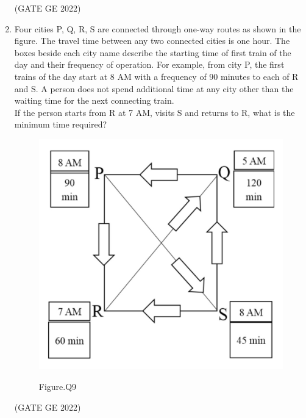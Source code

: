 \documentclass[journal,12pt,onecolumn]{IEEEtran}
\theoremstyle{remark}
\begin{document}
\begin{enumerate}
\hfill (GATE GE 2022)

\begin{enumerate}
\end{enumerate}

\item Four cities P, Q, R, S are connected through one-way routes as shown in the figure. The travel time between any two connected cities is one hour. The boxes beside each city name describe the starting time of first train of the day and their frequency of operation. For example, from city P, the first trains of the day start at 8 AM with a frequency of 90 minutes to each of R and S. A person does not spend additional time at any city other than the waiting time for the next connecting train. \\
If the person starts from R at 7 AM, visits S and returns to R, what is the minimum time required?
\begin{figure}[H]
    \centering
    \includegraphics[width=0.4\columnwidth]{figs/fig_9.png}
    \label{fig:question9}
    \caption*{Figure.Q9}
\end{figure}

\hfill (GATE GE 2022)

\begin{enumerate}
\end{enumerate}


\end{enumerate}
\end{document}
